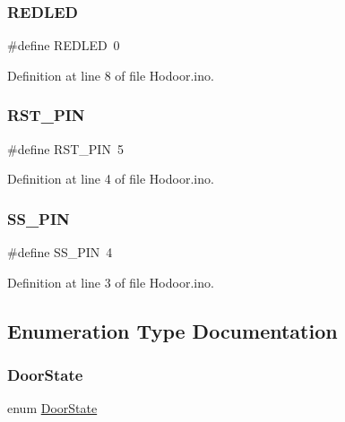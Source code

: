 \subsubsection{\texorpdfstring{R\+E\+D\+L\+ED}{REDLED}}
{\footnotesize\ttfamily \#define R\+E\+D\+L\+ED~0}



Definition at line 8 of file Hodoor.\+ino.

\mbox{\label{_hodoor_8ino_a36932b0e869e0114f32e255f61306d6b}} 
\subsubsection{\texorpdfstring{R\+S\+T\+\_\+\+P\+IN}{RST\_PIN}}
{\footnotesize\ttfamily \#define R\+S\+T\+\_\+\+P\+IN~5}



Definition at line 4 of file Hodoor.\+ino.

\mbox{\label{_hodoor_8ino_a86fac98c9b4c98a3e50fc45440878391}} 
\subsubsection{\texorpdfstring{S\+S\+\_\+\+P\+IN}{SS\_PIN}}
{\footnotesize\ttfamily \#define S\+S\+\_\+\+P\+IN~4}



Definition at line 3 of file Hodoor.\+ino.



\subsection{Enumeration Type Documentation}
\mbox{\label{_hodoor_8ino_a117f8df7c03b73093e6da94ae41b4252}} 
\subsubsection{\texorpdfstring{Door\+State}{DoorState}}
{\footnotesize\ttfamily enum \mbox{\hyperlink{_hodoor_8ino_a117f8df7c03b73093e6da94ae41b4252}{Door\+State}}}

